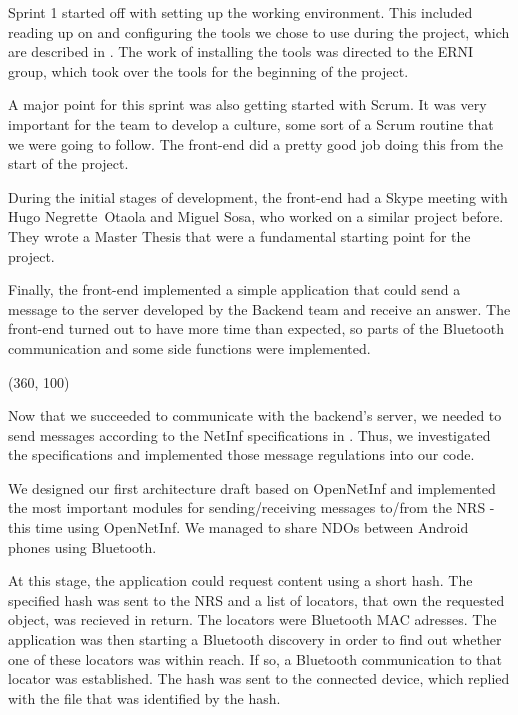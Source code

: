 Sprint 1 started off with setting up the working environment.
This included reading up on and configuring the tools we chose to use during the project,
which are described in . The work of installing the tools was directed to the
ERNI group, which took over the tools for the beginning of the project. 

A major point for this sprint was also getting started with Scrum. It was very important
for the team to develop a culture, some sort of a Scrum routine that we were going to follow.
The front-end  did a pretty good job doing this from the start of the project.

During the initial stages of development, the front-end had a Skype meeting with Hugo Negrette~Otaola and
Miguel Sosa, who worked on a similar project before. They wrote a Master Thesis \cite{hugomiguel}
that were a fundamental starting point for the project.

Finally, the front-end implemented a simple application that could send a message to 
the server developed by the Backend team and receive an answer. The front-end turned out to have more time than expected, so parts of the Bluetooth communication and
some side functions were implemented.

\framebox(360, 100){
}

Now that we succeeded to communicate with the backend's server,
we needed to send messages according to the NetInf specifications in \cite{netinfspecs}.
Thus, we investigated the specifications and implemented those message regulations
into our code. 

We designed our first architecture draft based on OpenNetInf and implemented
the most important modules for sending/receiving messages to/from the NRS -
this time using OpenNetInf. We managed to share NDOs between
Android phones using Bluetooth.

At this stage, the application could request content using a short hash.
The specified hash was sent to the NRS and a list of locators, that own
the requested object, was recieved in return. The locators were Bluetooth MAC adresses.
The application was then starting a Bluetooth discovery in order to find out
whether one of these locators was within reach. If so, a Bluetooth communication
to that locator was established. The hash was sent to the connected device, which
replied with the file that was identified by the hash.

